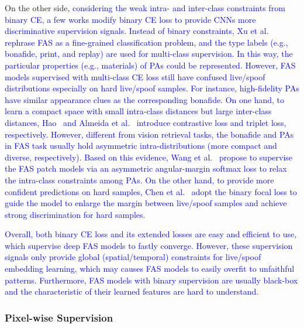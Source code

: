 \documentclass[10pt,journal,compsoc]{IEEEtran}
\begin{document}
On the other side, \textcolor{blue}{considering the weak intra- and inter-class constraints from binary CE, a few works modify binary CE loss to provide CNNs more discriminative supervision signals. Instead of binary constraints, Xu et al.~\cite{xu2020improving} rephrase FAS as a fine-grained classification problem, and the type labels (e.g., bonafide, print, and replay) are used for multi-class supervision. In this way, the particular properties (e.g., materials) of PAs could be represented. However, FAS models supervised with multi-class CE loss still have confused live/spoof distributions especially on hard live/spoof samples. For instance, high-fidelity PAs have similar appearance clues as the corresponding bonafide. On one hand, to learn a compact space with small intra-class distances but large inter-class distances, Hao~\cite{hao2019face} and Almeida et al.~\cite{almeida2020detecting} introduce contrastive loss and triplet loss, respectively. However, different from vision retrieval tasks, the bonafide and PAs in FAS task usually hold asymmetric intra-distributions (more compact and diverse, respectively). Based on this evidence, Wang et al.~\cite{wang2022patchnet} propose to supervise the FAS patch models via an asymmetric angular-margin softmax loss to relax the intra-class constraints among PAs. On the other hand, to provide more confident predictions on hard samples, Chen et al.~\cite{chen2021camera} adopt the binary focal loss to guide the model to enlarge the margin between live/spoof samples and achieve strong discrimination for hard samples.}


\textcolor{blue}{Overall, both binary CE loss and its extended losses are easy and efficient to use, which supervise deep FAS models to fastly converge. However, these supervision signals only provide global (spatial/temporal) constraints for live/spoof embedding learning, which may causes FAS models to easily overfit to unfaithful patterns. Furthermore, FAS models with binary supervision are usually black-box and the characteristic of their learned features  are hard to understand.}



\subsubsection{Pixel-wise Supervision}
\end{document}
